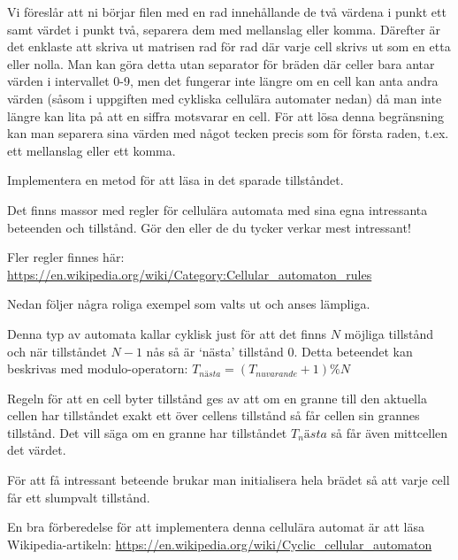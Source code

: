         Vi föreslår att ni börjar filen med en rad innehållande de två värdena i punkt ett samt värdet i punkt två, separera dem med mellanslag eller komma. Därefter är det enklaste att skriva ut matrisen rad för rad där varje cell skrivs ut som en etta eller nolla. Man kan göra detta utan separator för bräden där celler bara antar värden i intervallet 0-9, men det fungerar inte längre om en cell kan anta andra värden (såsom i uppgiften med cykliska cellulära automater nedan) då man inte längre kan lita på att en siffra motsvarar en cell. För att lösa denna begränsning kan man separera sina värden med något tecken precis som för första raden, t.ex. ett mellanslag eller ett komma.
        
        Implementera en metod för att läsa in det sparade tillståndet.


    Det finns massor med regler för cellulära automata med sina egna intressanta beteenden och tillstånd.
    Gör den eller de du tycker verkar mest intressant!

    Fler regler finnes här: \url{https://en.wikipedia.org/wiki/Category:Cellular_automaton_rules}

    Nedan följer några roliga exempel som valts ut och anses lämpliga.


        Denna typ av automata kallar cyklisk just för att det finns $N$ möjliga tillstånd och när tillståndet $N-1$ nås så är `nästa' tillstånd $0$.
        Detta beteendet kan beskrivas med modulo-operatorn: $T_{nästa} = (T_{nuvarande} + 1) \% N$

        Regeln för att en cell byter tillstånd ges av att om en granne till den aktuella cellen har tillståndet exakt ett över cellens tillstånd så får cellen sin grannes tillstånd. Det vill säga om en granne har tillståndet $T_nästa$ så får även mittcellen det värdet.

        För att få intressant beteende brukar man initialisera hela brädet så att varje cell får ett slumpvalt tillstånd.

        En bra förberedelse för att implementera denna cellulära automat är att läsa Wikipedia-artikeln: \url{https://en.wikipedia.org/wiki/Cyclic_cellular_automaton}


